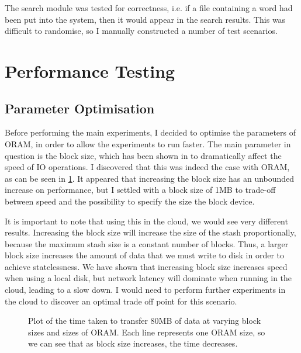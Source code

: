 \documentclass[12pt,a4paper,twoside,openright]{report}
\begin{document}
The search module was tested for correctness, i.e. if a file containing a word had been put into the system, then it would appear in the search results. This was difficult to randomise, so I manually constructed a number of test scenarios.

\section{Performance Testing}
\label{sec:performanceTesting}

\subsection{Parameter Optimisation}
\label{sub:parameterOptimisation}

Before performing the main experiments, I decided to optimise the parameters of ORAM, in order to allow the experiments to run faster. The main parameter in question is the block size, which has been shown in \citet{ousterhout1985trace} to dramatically affect the speed of IO operations. I discovered that this was indeed the case with ORAM, as can be seen in \cref{fig:blockSizeResults}. It appeared that increasing the block size has an unbounded increase on performance, but I settled with a block size of 1MB to trade-off between speed and the possibility to specify the size the block device.

It is important to note that using this in the cloud, we would see very different results. Increasing the block size will increase the size of the stash proportionally, because the maximum stash size is a constant number of blocks. Thus, a larger block size increases the amount of data that we must write to disk in order to achieve statelessness. We have shown that increasing block size increases speed when using a local disk, but network latency will dominate when running in the cloud, leading to a slow down. I would need to perform further experiments in the cloud to discover an optimal trade off point for this scenario.

\begin{figure}
    \centering
    
    \caption{Plot of the time taken to transfer 80MB of data at varying block sizes and sizes of ORAM. Each line represents one ORAM size, so we can see that as block size increases, the time decreases.}
    \label{fig:blockSizeResults}
\end{figure}
\end{document}
